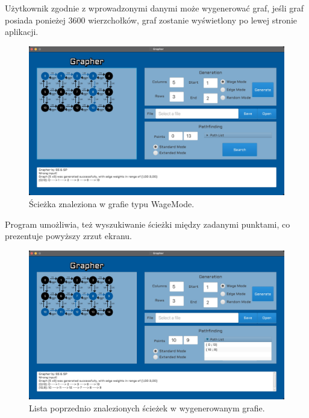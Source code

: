\documentclass[10pt, a4paper]{report}
\begin{document}
  Użytkownik zgodnie z wprowadzonymi danymi może wygenerować graf, jeśli graf posiada ponieżej 3600 wierzchołków, graf zostanie wyświetlony po lewej stronie aplikacji.

  \newpage
  \begin{figure}[h]
    \begin{center}
        \includegraphics[scale=0.165]{grapherWageModeWithPath.jpg}
        \caption{Ścieżka znaleziona w grafie typu WageMode.}
    \end{center}
  \end{figure}

  Program umożliwia, też wyszukiwanie ścieżki między zadanymi punktami, co prezentuje powyższy zrzut ekranu.
  \newpage

  \begin{figure}[h]
    \begin{center}
        \includegraphics[scale=0.165]{grapherWageModePathList.jpg}
        \caption{Lista poprzednio znalezionych ścieżek w wygenerowanym grafie.}
    \end{center}
  \end{figure}
\end{document}
